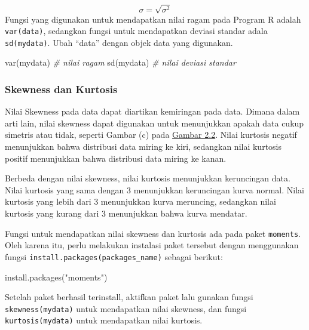 \documentclass[
]{book}
\newenvironment{Shaded}{\begin{snugshade}}{\end{snugshade}}
\newcommand{\CommentTok}[1]{\textcolor[rgb]{0.56,0.35,0.01}{\textit{#1}}}
\newcommand{\FunctionTok}[1]{\textcolor[rgb]{0.00,0.00,0.00}{#1}}
\newcommand{\NormalTok}[1]{#1}
\newcommand{\StringTok}[1]{\textcolor[rgb]{0.31,0.60,0.02}{#1}}
\begin{document}
\[
\sigma = \sqrt{\sigma^2}
\]
Fungsi yang digunakan untuk mendapatkan nilai ragam pada Program R adalah \texttt{var(data)}, sedangkan fungsi untuk mendapatkan deviasi standar adala \texttt{sd(mydata)}. Ubah ``data'' dengan objek data yang digunakan.

\begin{Shaded}
\begin{Highlighting}[]
\FunctionTok{var}\NormalTok{(mydata) }\CommentTok{\# nilai ragam}
\FunctionTok{sd}\NormalTok{(mydata)  }\CommentTok{\# nilai deviasi standar}
\end{Highlighting}
\end{Shaded}

\hypertarget{skewness-dan-kurtosis}{%
\subsubsection{Skewness dan Kurtosis}\label{skewness-dan-kurtosis}}

Nilai Skewness pada data dapat diartikan kemiringan pada data. Dimana dalam arti lain, nilai skewness dapat digunakan untuk menunjukkan apakah data cukup simetris atau tidak, seperti Gambar (c) pada \protect\hyperlink{fig:a2-fig2}{Gambar 2.2}. Nilai kurtosis negatif menunjukkan bahwa distribusi data miring ke kiri, sedangkan nilai kurtosis positif menunjukkan bahwa distribusi data miring ke kanan.

Berbeda dengan nilai skewness, nilai kurtosis menunjukkan keruncingan data. Nilai kurtosis yang sama dengan 3 menunjukkan keruncingan kurva normal. Nilai kurtosis yang lebih dari 3 menunjukkan kurva meruncing, sedangkan nilai kurtosis yang kurang dari 3 menunjukkan bahwa kurva mendatar.

Fungsi untuk mendapatkan nilai skewness dan kurtosis ada pada paket \texttt{moments}. Oleh karena itu, perlu melakukan instalasi paket tersebut dengan menggunakan fungsi \texttt{install.packages(packages\_name)} sebagai berikut:

\begin{Shaded}
\begin{Highlighting}[]
\FunctionTok{install.packages}\NormalTok{(}\StringTok{"moments"}\NormalTok{)}
\end{Highlighting}
\end{Shaded}

Setelah paket berhasil terinstall, aktifkan paket lalu gunakan fungsi \texttt{skewness(mydata)} untuk mendapatkan nilai skewness, dan fungsi \texttt{kurtosis(mydata)} untuk mendapatkan nilai kurtosis.
\end{document}
